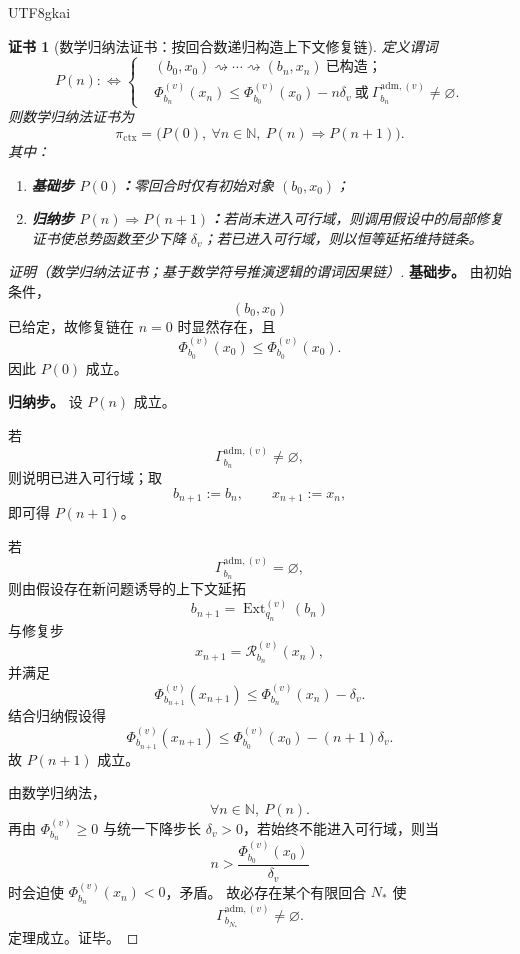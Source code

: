 \documentclass[12pt]{article}
\newtheorem{Certificate}{证书}[section]
\newcommand{\NN}{\mathbb{N}}
\newcommand{\Ext}{\operatorname{Ext}}
\begin{document}
\begin{CJK*}{UTF8}{gkai}
\begin{Certificate}[数学归纳法证书：按回合数递归构造上下文修复链]
\label{cert:tex39-axiom}
定义谓词
\[
  P(n)
  :
  \Longleftrightarrow
  \left\{
  \begin{aligned}
    &(b_0,x_0)\rightsquigarrow\cdots\rightsquigarrow(b_n,x_n)\ \text{已构造；}\\
    &\Phi_{b_n}^{(v)}(x_n)\le \Phi_{b_0}^{(v)}(x_0)-n\delta_v\ \text{或}\ \Gamma_{b_n}^{\mathrm{adm},(v)}\neq\varnothing.
  \end{aligned}
  \right.
\]
则数学归纳法证书为
\[
  \pi_{\mathrm{ctx}}
  =
  \bigl(
    P(0),\
    \forall n\in\NN,\ P(n)\Rightarrow P(n+1)
  \bigr).
\]
其中：
\begin{enumerate}
  \item \textbf{基础步 $P(0)$：}零回合时仅有初始对象 $(b_0,x_0)$；
  \item \textbf{归纳步 $P(n)\Rightarrow P(n+1)$：}若尚未进入可行域，则调用假设中的局部修复证书使总势函数至少下降 $\delta_v$；若已进入可行域，则以恒等延拓维持链条。
\end{enumerate}
\end{Certificate}

\begin{proof}[证明（数学归纳法证书；基于数学符号推演逻辑的谓词因果链）]
\textbf{基础步。}
由初始条件，
\[
  (b_0,x_0)
\]
已给定，故修复链在 $n=0$ 时显然存在，且
\[
  \Phi_{b_0}^{(v)}(x_0)\le \Phi_{b_0}^{(v)}(x_0).
\]
因此 $P(0)$ 成立。

\textbf{归纳步。}
设 $P(n)$ 成立。

若
\[
  \Gamma_{b_n}^{\mathrm{adm},(v)}\neq\varnothing,
\]
则说明已进入可行域；取
\[
  b_{n+1}:=b_n,\qquad x_{n+1}:=x_n,
\]
即可得 $P(n+1)$。

若
\[
  \Gamma_{b_n}^{\mathrm{adm},(v)}=\varnothing,
\]
则由假设存在新问题诱导的上下文延拓
\[
  b_{n+1}=\Ext_{q_n}^{(v)}(b_n)
\]
与修复步
\[
  x_{n+1}=\mathcal R_{b_n}^{(v)}(x_n),
\]
并满足
\[
  \Phi_{b_{n+1}}^{(v)}(x_{n+1})
  \le
  \Phi_{b_n}^{(v)}(x_n)-\delta_v.
\]
结合归纳假设得
\[
  \Phi_{b_{n+1}}^{(v)}(x_{n+1})
  \le
  \Phi_{b_0}^{(v)}(x_0)-(n+1)\delta_v.
\]
故 $P(n+1)$ 成立。

由数学归纳法，
\[
  \forall n\in\NN,\ P(n).
\]
再由 $\Phi_{b_n}^{(v)}\ge 0$ 与统一下降步长 $\delta_v>0$，若始终不能进入可行域，则当
\[
  n>
  \frac{\Phi_{b_0}^{(v)}(x_0)}{\delta_v}
\]
时会迫使 $\Phi_{b_n}^{(v)}(x_n)<0$，矛盾。
故必存在某个有限回合 $N_\ast$ 使
\[
  \Gamma_{b_{N_\ast}}^{\mathrm{adm},(v)}\neq\varnothing.
\]
定理成立。证毕。
\end{proof}


\end{CJK*}
\end{document}
